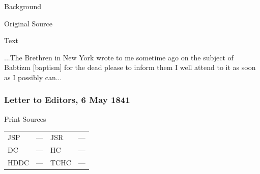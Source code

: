 			\begin{description}
				\item[Background]
			\end{description}
			
			
			\begin{description}
				\item[Original Source]
			\end{description}
			
			
			\begin{description}
				\item[Text]
			\end{description}
			
				...The Brethren in New York wrote to me sometime ago on the subject of Babtizm [baptism] for the dead please to inform them I well attend to it as soon as I possibly can...
				
		\subsubsection{Letter to Editors, 6 May 1841}
			\label{EMS-1841-JS-6-MAY-1841}
			
			\begin{description}
				\item[Print Sources]
			\end{description}

			\begin{tabular}{p{0.5in}p{1in}p{0.5in}p{1in}}
				JSP	 	& ---		& JSR 		& --- \\
				DC	 	& ---		& HC 		& --- \\
				HDDC 	& ---		& TCHC 		& --- \\
			\end{tabular}
			
